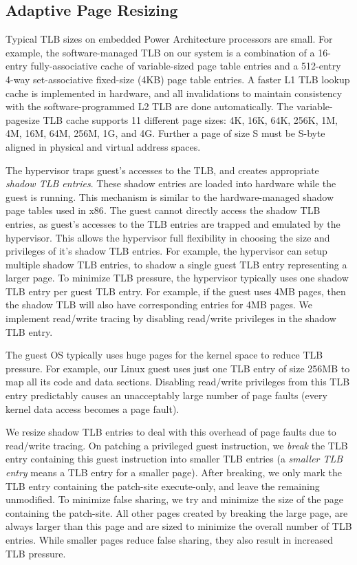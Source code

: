 \documentclass[10pt,twocolumn]{article}
\begin{document}
\subsection{Adaptive Page Resizing}
Typical TLB sizes on embedded Power Architecture processors are small.
For example, the software-managed TLB on our system is a combination of a 16-entry
fully-associative cache of variable-sized page table entries
and a 512-entry 4-way set-associative fixed-size (4KB) page table entries.
A faster L1 TLB lookup cache is implemented in hardware, and all invalidations
to maintain consistency with the software-programmed L2 TLB are done automatically.
The variable-pagesize TLB cache supports 11 different page sizes: 4K, 16K, 64K,
256K, 1M, 4M, 16M, 64M, 256M, 1G, and 4G. Further a page of size S must be S-byte
aligned in physical and virtual address spaces.

The hypervisor traps guest's accesses to the TLB, and creates appropriate
{\em shadow TLB entries}. These shadow entries are loaded into hardware
while the guest is
running. This mechanism is similar to the hardware-managed shadow page
tables used in x86\cite{agesen:comparison}. The guest cannot directly access the shadow
TLB entries, as guest's accesses to the TLB entries are trapped and emulated by
the hypervisor. This allows the hypervisor full flexibility in choosing the
size and privileges of it's shadow TLB entries. For example, the hypervisor
can setup multiple shadow TLB entries, to shadow a single guest TLB entry representing
a larger page.
To minimize TLB pressure, the hypervisor typically uses
one shadow TLB entry per guest TLB entry. For example, if the guest uses 4MB pages,
then the shadow TLB will also have corresponding entries for 4MB pages. We
implement read/write tracing by disabling read/write privileges in the shadow TLB entry.

The guest OS typically uses huge pages for the kernel space to
reduce TLB pressure. For example, our Linux guest
uses just one TLB entry of size 256MB to map all its code and data sections.
Disabling read/write privileges from this TLB entry predictably causes an unacceptably
large number of page faults (every kernel data access becomes a page fault).

We resize shadow TLB entries to deal with this overhead of page faults due to read/write
tracing. On patching a privileged guest instruction, we {\em break} the TLB entry
containing this guest instruction into smaller TLB entries
(a {\em smaller TLB entry} means a TLB entry for a smaller page). After breaking,
we only mark the
TLB entry containing the patch-site execute-only, and leave the remaining
unmodified.
To minimize false sharing, we try and minimize the
size of the page containing the patch-site. All other pages created by
breaking the large page, are always larger than this page and are sized
to minimize
the overall number of TLB entries. While smaller pages reduce false sharing, they
also result in increased TLB pressure.
\end{document}
